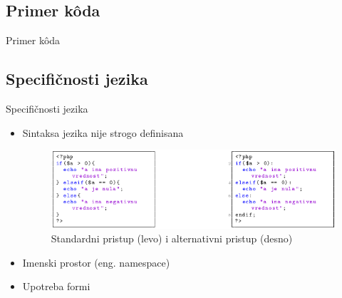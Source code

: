 \documentclass{beamer}
\begin{document}
\subsection{Primer k\^{o}da}
\begin{frame}{Primer k\^{o}da}
    
\end{frame}

\subsection{Specifičnosti jezika}
\begin{frame}{Specifičnosti jezika}
    \begin{itemize}
		\item Sintaksa jezika nije strogo definisana
		
		\begin{figure}[h!]
                \begin{center}
                \includegraphics[scale=0.40]{kod.png}
                \end{center}
                \caption{Standardni pristup (levo) i alternativni pristup (desno)}
                \label{fig:kod}
                \end{figure}
                
		\item Imenski prostor (eng. namespace)
		\item Upotreba formi
	\end{itemize}
\end{frame}
\end{document}
